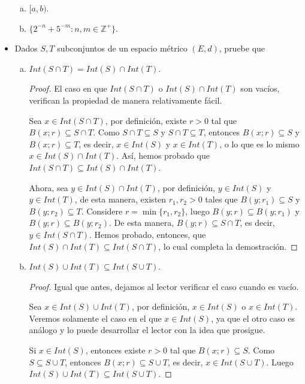 \begin{itemize}[leftmargin=*]
\begin{enumerate}[a)]
        \item $[a,b)$.
        \item $\{2^{-n}+5^{-m}:n,m \in \mathbb{Z}^+\}$.
    \end{enumerate}
    \item Dados $S,T$ subconjuntos de un espacio métrico $(E,d)$, pruebe que 
    \begin{enumerate}[a)]
        \item $Int(S\cap T)=Int(S)\cap Int(T)$.
        \begin{proof}
            El caso en que $Int(S \cap T)$ o $Int(S)\cap Int(T)$ son vacíos, verifican la propiedad de manera relativamente fácil.
            
            Sea $x \in Int(S \cap T)$, por definición, existe $r>0$ tal que $B(x;r) \subseteq S \cap T$. Como $S \cap T \subseteq S$ y $S \cap T \subseteq T$, entonces $B(x;r) \subseteq S$ y $B(x;r) \subseteq T$, es decir, $x \in Int(S)$ y $x \in Int(T)$, o lo que es lo mismo $x \in Int(S) \cap Int(T)$. Así, hemos probado que $Int(S \cap T)\subseteq Int(S) \cap Int(T)$.

            Ahora, sea $y \in Int(S) \cap Int(T)$, por definición, $y \in Int(S)$ y $y \in Int(T)$, de esta manera, existen $r_1,r_2>0$ tales que $B(y;r_1)\subseteq S$ y $B(y;r_2)\subseteq T$. Considere $r=\min\{r_1,r_2\}$, luego $B(y;r)\subseteq B(y;r_1)$ y $B(y;r) \subseteq B(y;r_2)$. De esta manera, $B(y;r) \subseteq S \cap T$, es decir, $y \in Int(S \cap T)$. Hemos probado, entonces, que $Int(S) \cap Int(T) \subseteq Int(S \cap T)$, lo cual completa la demostración.
        \end{proof}
        
        \item $Int(S) \cup Int(T) \subseteq Int(S \cup T)$.\\
        
        \begin{proof}
            Igual que antes, dejamos al lector verificar el caso cuando es vacío.

            Sea $x \in Int(S) \cup Int(T)$, por definición, $x \in Int(S)$ o $x \in Int(T)$. Veremos solamente el caso en el que $x \in Int(S)$, ya que el otro caso es análogo y lo puede desarrollar el lector con la idea que prosigue.

            Si $x \in Int(S)$, entonces existe $r>0$ tal que $B(x;r) \subseteq S$. Como $S \subseteq S \cup T$, entonces $B(x;r)\subseteq S \cup T$, es decir, $x \in Int(S \cup T)$. Luego $Int(S) \cup Int(T) \subseteq Int(S \cup T)$.
        \end{proof}
        

\end{enumerate}
\end{itemize}

